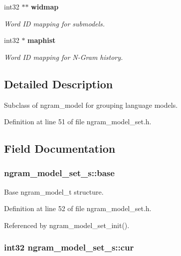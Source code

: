 \begin{CompactItemize}
int32 $\ast$$\ast$ {\bf widmap}
\begin{CompactList}\small\item\em Word ID mapping for submodels. \item\end{CompactList}\item 
int32 $\ast$ {\bf maphist}
\begin{CompactList}\small\item\em Word ID mapping for N-Gram history. \item\end{CompactList}\end{CompactItemize}


\subsection{Detailed Description}
Subclass of ngram\_\-model for grouping language models. 

Definition at line 51 of file ngram\_\-model\_\-set.h.

\subsection{Field Documentation}
\subsubsection[{base}]{ {\bf ngram\_\-model\_\-set\_\-s::base}}\label{structngram__model__set__s_3b88f17aa148ceac4f32dd4cbf5f4f81}


Base ngram\_\-model\_\-t structure. 



Definition at line 52 of file ngram\_\-model\_\-set.h.

Referenced by ngram\_\-model\_\-set\_\-init().
\subsubsection[{cur}]{\setlength{\rightskip}{0pt plus 5cm}int32 {\bf ngram\_\-model\_\-set\_\-s::cur}}\label{structngram__model__set__s_031e7d7dcf1667f69e1cb980f45623cb}


